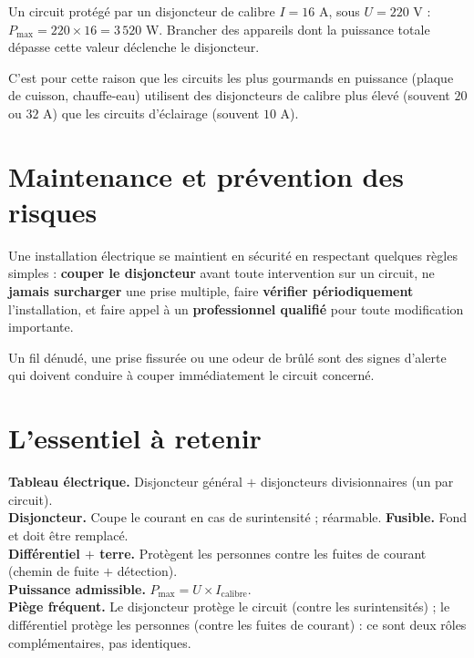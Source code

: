 \begin{exemple}
Un circuit protégé par un disjoncteur de calibre $I=16$ A, sous $U=220$ V :
$P_{\max}=220\times16=3\,520$ W. Brancher des appareils dont la puissance totale dépasse
cette valeur déclenche le disjoncteur.
\end{exemple}

\begin{remarque}
C'est pour cette raison que les circuits les plus gourmands en puissance (plaque de
cuisson, chauffe-eau) utilisent des disjoncteurs de calibre plus élevé (souvent $20$ ou
$32$ A) que les circuits d'éclairage (souvent $10$ A).
\end{remarque}

\section{Maintenance et prévention des risques}

\begin{propriete}
Une installation électrique se maintient en sécurité en respectant quelques règles
simples : \textbf{couper le disjoncteur} avant toute intervention sur un circuit, ne
\textbf{jamais surcharger} une prise multiple, faire \textbf{vérifier périodiquement}
l'installation, et faire appel à un \textbf{professionnel qualifié} pour toute
modification importante.
\end{propriete}

\begin{remarque}
Un fil dénudé, une prise fissurée ou une odeur de brûlé sont des signes d'alerte qui
doivent conduire à couper immédiatement le circuit concerné.
\end{remarque}

\section{L'essentiel à retenir}

\begin{synthese}
\textbf{Tableau électrique.} Disjoncteur général $+$ disjoncteurs divisionnaires (un par
circuit).\\[4pt]
\textbf{Disjoncteur.} Coupe le courant en cas de surintensité ; réarmable.
\textbf{Fusible.} Fond et doit être remplacé.\\[4pt]
\textbf{Différentiel $+$ terre.} Protègent les personnes contre les fuites de courant
(chemin de fuite $+$ détection).\\[4pt]
\textbf{Puissance admissible.} $P_{\max}=U\times I_{\text{calibre}}$.\\[4pt]
\textbf{Piège fréquent.} Le disjoncteur protège le circuit (contre les surintensités) ;
le différentiel protège les personnes (contre les fuites de courant) : ce sont deux rôles
complémentaires, pas identiques.
\end{synthese}


